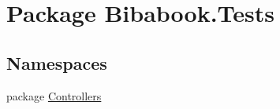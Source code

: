\hypertarget{namespace_bibabook_1_1_tests}{}\section{Package Bibabook.\+Tests}
\label{namespace_bibabook_1_1_tests}
\subsection*{Namespaces}
\begin{DoxyCompactItemize}
\item 
package \hyperlink{namespace_bibabook_1_1_tests_1_1_controllers}{Controllers}
\end{DoxyCompactItemize}
